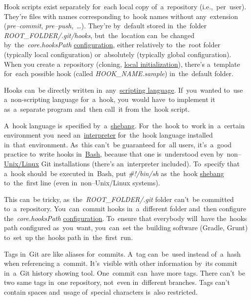 Hook scripts exist separately for~each local copy of~a~repository (i.e.,~per~user).
They're files with names corresponding to~hook names without any~extension (\textit{pre--commit}, \textit{pre--push},~\dots).
They're by~default stored in~the~folder \textit{ROOT\_FOLDER/.git/hooks}, but~the~location can~be changed by~the~\textit{core.hooksPath} \hyperref[gitconfig]{configuration}, either relatively to~the~root folder (typically local configuration) or~absolutely (typically global configuration).
When you create a~repository (cloning, \hyperref[initrepo]{local initialization}), there's a~template for~each possible hook (called \textit{HOOK\_NAME.sample}) in~the~default folder.

Hooks can~be directly written in~any~\hyperref[scriptinglanguages]{scripting language}.
If~you~wanted to~use a~non-scripting language for~a~hook, you~would have~to implement it as~a~separate program and~then call~it from the~hook script.

A~hook language is~specified by~a~\hyperref[shebang]{shebang}.
For~the~hook to~work in~a~certain environment you~need an~\hyperref[compiledinterpretedlanguages]{interpreter} for~the~hook language installed in~that~environment.
As~this can't~be guaranteed for~all users, it's~a~good practice to~write hooks in~\hyperref[shbash]{Bash}, because that one is~understood even  by~non--\hyperref[linux]{Unix/Linux} Git installations (there's an~interpreter included).
To~specify that a~hook should~be executed in~Bash, put \textit{\#!/bin/sh} as~the~hook \hyperref[shebang]{shebang} to~the~first line (even in~non--Unix/Linux systems).

This can~be tricky, as~the~\textit{ROOT\_FOLDER/.git} folder can't~be committed to~a~repository.
You~can~commit hooks in~a~different folder and~then configure the~\textit{core.hooksPath} \hyperref[gitconfig]{configuration}.
To~ensure that everybody will~have the~hooks path configured as~you~want, you~can~set the~building software (Gradle, Grunt) to~set~up the~hooks path in~the~first~run.

Tags in~Git are like aliases for~commits.
A~tag can~be~used instead of~a~hash when referencing a~commit.
It's~visible with other information by~its commit in~a~Git history showing tool.
One~commit can~have more tags.
There can't~be two same tags in~one repository, not~even in~different branches.
Tags can't contain spaces and~usage of~special characters is~also restricted.

